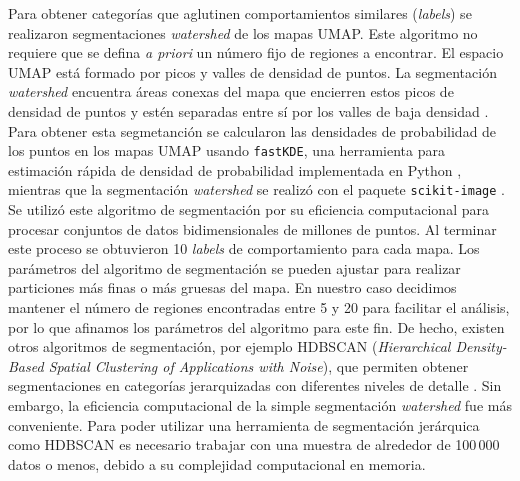 Para obtener categorías que aglutinen comportamientos similares (\textit{labels}) se realizaron segmentaciones \textit{watershed} de los mapas UMAP. Este algoritmo no requiere que se defina \textit{a priori} un número fijo de regiones a encontrar. El espacio UMAP está formado por picos y valles de densidad de puntos. La segmentación \textit{watershed} encuentra áreas conexas del mapa que encierren estos picos de densidad de puntos y estén separadas entre sí por los valles de baja densidad \cite{meyer_watershed_history, compact}. Para obtener esta segmetanción se calcularon las densidades de probabilidad de los puntos en los mapas UMAP usando \texttt{fastKDE}, una herramienta para estimación rápida de densidad de probabilidad implementada en Python \cite{obrien_fastkde}, mientras que la segmentación \textit{watershed} se realizó con el paquete \texttt{scikit-image} \cite{scikit-image}. Se utilizó este algoritmo de segmentación por su eficiencia computacional para procesar conjuntos de datos bidimensionales de millones de puntos. Al terminar este proceso se obtuvieron 10 \textit{labels} de comportamiento para cada mapa. Los parámetros del algoritmo de segmentación se pueden ajustar para realizar particiones más finas o más gruesas del mapa. En nuestro caso decidimos mantener el número de regiones encontradas entre 5 y 20 para facilitar el análisis, por lo que afinamos los parámetros del algoritmo para este fin. De hecho, existen otros algoritmos de segmentación, por ejemplo HDBSCAN (\textit{Hierarchical Density-Based Spatial Clustering of Applications with Noise}), que permiten obtener segmentaciones en categorías jerarquizadas con diferentes niveles de detalle \cite{hdbscan}. Sin embargo, la eficiencia computacional de la simple segmentación \textit{watershed} fue más conveniente. Para poder utilizar una herramienta de segmentación jerárquica como HDBSCAN es necesario trabajar con una muestra de alrededor de 100\,000 datos o menos, debido a su complejidad computacional en memoria.


